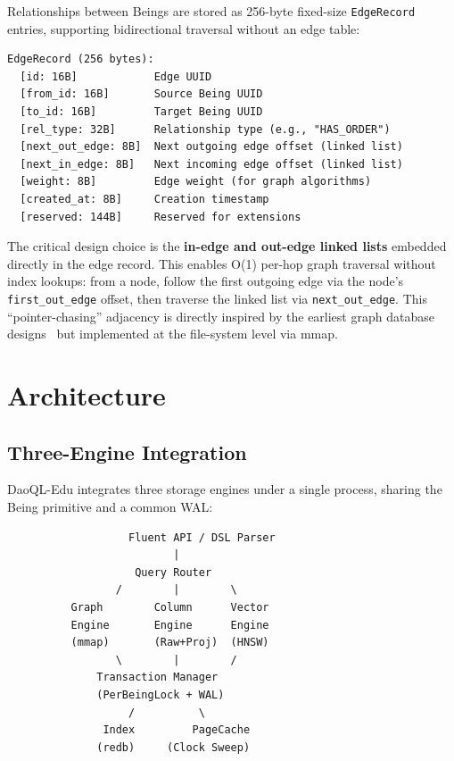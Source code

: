 \documentclass[11pt,a4paper]{article}
\begin{document}
Relationships between Beings are stored as 256-byte fixed-size
\texttt{EdgeRecord} entries, supporting bidirectional traversal without an
edge table:

\begin{verbatim}
EdgeRecord (256 bytes):
  [id: 16B]            Edge UUID
  [from_id: 16B]       Source Being UUID
  [to_id: 16B]         Target Being UUID
  [rel_type: 32B]      Relationship type (e.g., "HAS_ORDER")
  [next_out_edge: 8B]  Next outgoing edge offset (linked list)
  [next_in_edge: 8B]   Next incoming edge offset (linked list)
  [weight: 8B]         Edge weight (for graph algorithms)
  [created_at: 8B]     Creation timestamp
  [reserved: 144B]     Reserved for extensions
\end{verbatim}

The critical design choice is the \textbf{in-edge and out-edge linked lists}
embedded directly in the edge record. This enables O(1) per-hop graph
traversal without index lookups: from a node, follow the first outgoing edge
via the node's \texttt{first\_out\_edge} offset, then traverse the linked
list via \texttt{next\_out\_edge}. This ``pointer-chasing'' adjacency is
directly inspired by the earliest graph database designs~\cite{angles2008}
but implemented at the file-system level via mmap.

\section{Architecture}

\subsection{Three-Engine Integration}

DaoQL-Edu integrates three storage engines under a single process, sharing
the Being primitive and a common WAL:

\begin{center}
\begin{verbatim}
                   Fluent API / DSL Parser
                          |
                    Query Router
                 /        |        \
          Graph        Column      Vector
          Engine       Engine      Engine
          (mmap)       (Raw+Proj)  (HNSW)
                 \        |        /
              Transaction Manager
              (PerBeingLock + WAL)
                   /          \
               Index         PageCache
              (redb)     (Clock Sweep)
\end{verbatim}
\end{center}
\end{document}
